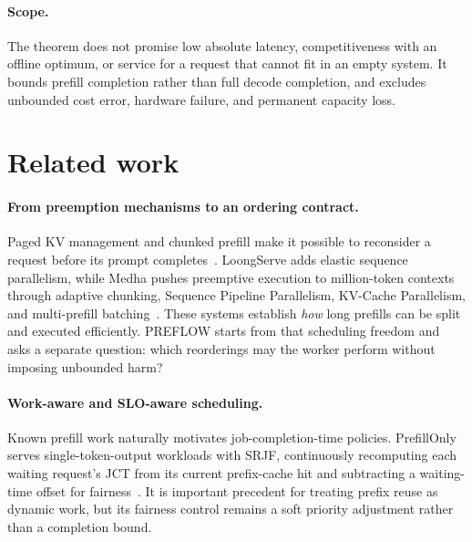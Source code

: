 \documentclass{article}
\newcommand{\preflow}{\textnormal{\textsc{PREFLOW}}}
\begin{document}
\paragraph{Scope.}
The theorem does not promise low absolute latency, competitiveness with an
offline optimum, or service for a request that cannot fit in an empty system.
It bounds prefill completion rather than full decode completion, and excludes
unbounded cost error, hardware failure, and permanent capacity loss.

\section{Related work}
\label{sec:related}

\paragraph{From preemption mechanisms to an ordering contract.}
Paged KV management and chunked prefill make it possible to reconsider a request
before its prompt completes~\citep{kwon2023vllm,agrawal2024sarathi,
zheng2024sglang}.  LoongServe adds elastic sequence parallelism, while Medha
pushes preemptive execution to million-token contexts through adaptive chunking,
Sequence Pipeline Parallelism, KV-Cache Parallelism, and multi-prefill
batching~\citep{wu2024loongserve,agrawal2024medha}.  These systems establish
\emph{how} long prefills can be split and executed efficiently.  \preflow{}
starts from that scheduling freedom and asks a separate question: which
reorderings may the worker perform without imposing unbounded harm?

\paragraph{Work-aware and SLO-aware scheduling.}
Known prefill work naturally motivates job-completion-time policies.
PrefillOnly serves single-token-output workloads with SRJF, continuously
recomputing each waiting request's JCT from its current prefix-cache hit and
subtracting a waiting-time offset for fairness~\citep{du2025prefillonly}.  It is
important precedent for treating prefix reuse as dynamic work, but its fairness
control remains a soft priority adjustment rather than a completion bound.
\end{document}
